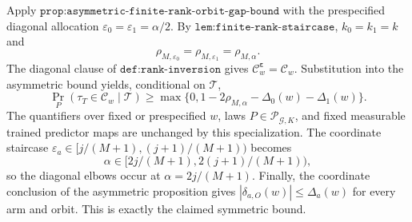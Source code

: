 Apply \(\texttt{prop:asymmetric-finite-rank-orbit-gap-bound}\) with the prespecified diagonal allocation \(\varepsilon_0=\varepsilon_1=\alpha/2\). By \(\texttt{lem:finite-rank-staircase}\), \(k_0=k_1=k\) and
\[\rho_{M,\varepsilon_0}=\rho_{M,\varepsilon_1}=\rho_{M,\alpha}.\]
The diagonal clause of \(\texttt{def:rank-inversion}\) gives \(\mathcal C^{\boldsymbol\varepsilon}_w=\mathcal C_w\). Substitution into the asymmetric bound yields, conditional on \(\mathcal T\),
\[\Pr_P(\tau_T\in\mathcal C_w\mid\mathcal T)\ge\max\{0,1-2\rho_{M,\alpha}-\Delta_0(w)-\Delta_1(w)\}.\]
The quantifiers over fixed or prespecified \(w\), laws \(P\in\mathcal P_{\mathcal G,K}\), and fixed measurable trained predictor maps are unchanged by this specialization. The coordinate staircase \(\varepsilon_a\in[j/(M+1),(j+1)/(M+1))\) becomes
\[\alpha\in[2j/(M+1),2(j+1)/(M+1)),\]
so the diagonal elbows occur at \(\alpha=2j/(M+1)\). Finally, the coordinate conclusion of the asymmetric proposition gives \(|\delta_{a,O}(w)|\le\Delta_a(w)\) for every arm and orbit. This is exactly the claimed symmetric bound.